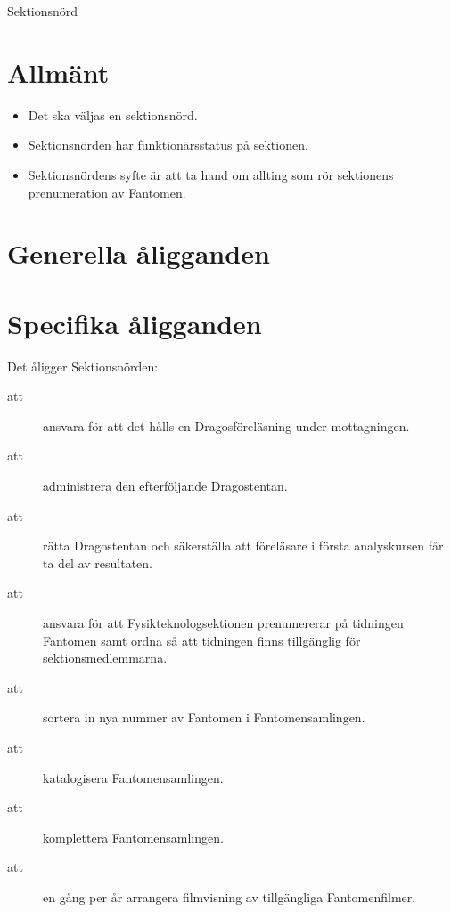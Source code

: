\documentclass[a4paper]{article}
\begin{document}
\renewcommand{\forening}{Sektionsnörd} %

\begin{foreningenv}{\forening{}} %
    \section{Allmänt}
    \begin{itemize}
        \item Det ska väljas en sektionsnörd.
        \item Sektionsnörden har funktionärsstatus på sektionen.
        \item Sektionsnördens syfte är att ta hand om allting som rör sektionens prenumeration av Fantomen.
    \end{itemize}
    
    \section{Generella åligganden}
    \aliggsektfunkt{}
    
    \section{Specifika åligganden}
    Det åligger \forening{}en:
    \begin{description}
        \item[att] ansvara för att det hålls en Dragosföreläsning under mottagningen.
        \item[att] administrera den efterföljande Dragostentan.
        \item[att] rätta Dragostentan och säkerställa att föreläsare i första analyskursen får ta del av resultaten.
        \item[att] ansvara för att Fysikteknologsektionen prenumererar på tidningen Fantomen samt ordna så att tidningen finns tillgänglig för sektionsmedlemmarna. %
        \item[att] sortera in nya nummer av Fantomen i Fantomensamlingen.
        \item[att] katalogisera Fantomensamlingen.
        \item[att] komplettera Fantomensamlingen.
        \item[att] en gång per år arrangera filmvisning av tillgängliga Fantomenfilmer.
    \end{description}
\end{foreningenv}
\end{document}
